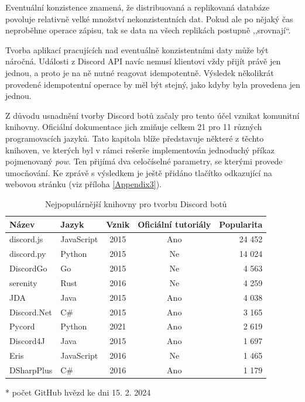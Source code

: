 \documentclass[FM]{tulthesis}
\begin{document}
	Eventuální konzistence znamená, že distribuovaná a replikovaná databáze povoluje relativně velké množství nekonzistentních dat. Pokud ale po nějaký čas neproběhne operace zápisu, tak se data na všech replikách postupně ,,srovnají``. \cite{book_distributedSystems4}
	
	Tvorba aplikací pracujících nad eventuálně konzistentními daty může být náročná. Události z Discord API navíc nemusí klientovi vždy přijít právě jen jednou, a proto je na ně nutné reagovat idempotentně. Výsledek několikrát provedené idempotentní operace by měl být stejný, jako kdyby byla provedena jen jednou. \cite{book_distributedSystemsUnderstanding}
	
	Z důvodu usnadnění tvorby Discord botů začaly pro tento účel vznikat komunitní knihovny. Oficiální dokumentace jich zmiňuje celkem 21 pro 11 různých programovacích jazyků. Tato kapitola blíže představuje některé z těchto knihoven, ve kterých byl v rámci rešerše implementován jednoduchý příkaz pojmenovaný \textit{pow}. Ten přijímá dva celočíselné parametry, se kterými provede umocňování. Ke zprávě s výsledkem je ještě přidáno tlačítko odkazující na webovou stránku (viz příloha \ref{Appendix3}).
	
	\begin{table}[ht]
		\centering
		\caption{Nejpopulárnější knihovny pro tvorbu Discord botů}\medskip
		\begin{threeparttable}
			\begin{tabular}{ l l c c r }
				\textbf{Název} & \textbf{Jazyk} & \textbf{Vznik} & \textbf{Oficiální tutoriály} & \textbf{Popularita}\tnote{*} \\\hline
				discord.js	& JavaScript & 2015 & Ano & 24 452 \\
				discord.py	& Python	 & 2015 & Ne  & 14 024 \\
				DiscordGo	& Go		 & 2015 & Ne  &  4 563 \\
				serenity	& Rust		 & 2016 & Ne  &  4 259 \\
				JDA			& Java		 & 2015 & Ano &  4 038 \\
				Discord.Net & C\#		 & 2015 & Ano &  3 165 \\
				Pycord		& Python	 & 2021 & Ano &  2 619 \\
				Discord4J	& Java		 & 2015 & Ano &  1 697 \\
				Eris		& JavaScript & 2016 & Ne  &  1 465 \\
				DSharpPlus	& C\#		 & 2016 & Ano &  1 179 \\
			\hline\end{tabular}
			\begin{tablenotes}
				\item[*] počet GitHub hvězd ke dni 15. 2. 2024
			\end{tablenotes}
		\end{threeparttable}
	\end{table}
	
\end{document}
